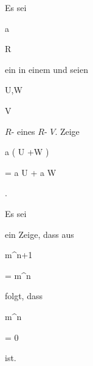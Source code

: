 {


Es sei


\mavergleichskette

{\vergleichskette

{ {\mathfrak a}
}

{ \subseteq }{ R
}

{  }{
}

{    }{
}

{   }{
}

}
{}{}{}
ein
in einem
und seien


\mavergleichskette

{\vergleichskette

{U,W
}

{ \subseteq }{ V
}

{  }{
}

{    }{
}

{   }{
}

}
{}{}{}
$R$-
eines
$R$-
$V$. Zeige


\mavergleichskettedisp

{\vergleichskette

{ {\mathfrak a}  \cdot \left(  U +W  \right)
}

{ =} { {\mathfrak a} \cdot U  + {\mathfrak a} \cdot W
}

{ } {
}

{ } {
}

{ } {
}

}
{}{}{.}


}

{} {}



{}

{


Es sei

 ein
Zeige, dass aus


\mavergleichskette

{\vergleichskette

{ {\mathfrak m}^{n+1}
}

{ = }{ {\mathfrak m}^n
}

{  }{
}

{    }{
}

{   }{
}

}
{}{}{}
folgt, dass


\mavergleichskette

{\vergleichskette

{ {\mathfrak m}^n
}

{ = }{ 0
}

{  }{
}

{    }{
}

{   }{
}

}
{}{}{}
ist.


}

